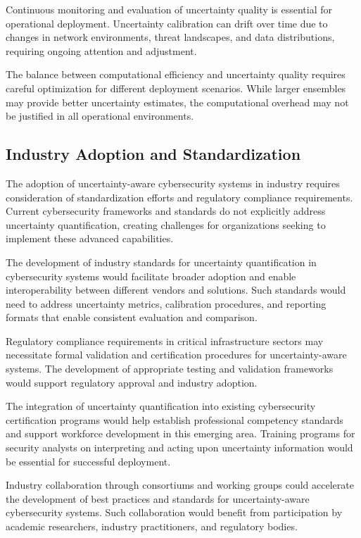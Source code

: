 \documentclass[journal]{IEEEtran}
\begin{document}
Continuous monitoring and evaluation of uncertainty quality is essential for operational deployment. Uncertainty calibration can drift over time due to changes in network environments, threat landscapes, and data distributions, requiring ongoing attention and adjustment.

The balance between computational efficiency and uncertainty quality requires careful optimization for different deployment scenarios. While larger ensembles may provide better uncertainty estimates, the computational overhead may not be justified in all operational environments.

\subsection{Industry Adoption and Standardization}

The adoption of uncertainty-aware cybersecurity systems in industry requires consideration of standardization efforts and regulatory compliance requirements. Current cybersecurity frameworks and standards do not explicitly address uncertainty quantification, creating challenges for organizations seeking to implement these advanced capabilities.

The development of industry standards for uncertainty quantification in cybersecurity systems would facilitate broader adoption and enable interoperability between different vendors and solutions. Such standards would need to address uncertainty metrics, calibration procedures, and reporting formats that enable consistent evaluation and comparison.

Regulatory compliance requirements in critical infrastructure sectors may necessitate formal validation and certification procedures for uncertainty-aware systems. The development of appropriate testing and validation frameworks would support regulatory approval and industry adoption.

The integration of uncertainty quantification into existing cybersecurity certification programs would help establish professional competency standards and support workforce development in this emerging area. Training programs for security analysts on interpreting and acting upon uncertainty information would be essential for successful deployment.

Industry collaboration through consortiums and working groups could accelerate the development of best practices and standards for uncertainty-aware cybersecurity systems. Such collaboration would benefit from participation by academic researchers, industry practitioners, and regulatory bodies.
\end{document}
